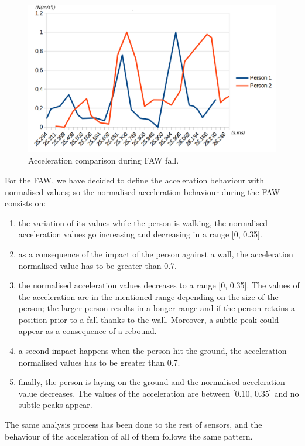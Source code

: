 \documentclass[conference]{IEEEtran}
\theoremstyle{definition}
\begin{document}
\begin{figure}[!h]
  \centering
  \includegraphics[scale=0.2]{img/TwoFallsComparative.png}
  \caption[Acceleration during FAW fall]{Acceleration comparison during FAW fall.}
  \label{fig:FAWcomparison}
\end{figure}

For the FAW, we have decided to define the acceleration behaviour with normalised values; so the 
normalised acceleration behaviour during the FAW consists on:
\begin{enumerate}
 \item the variation of its values while the person is walking, the normalised acceleration values go increasing and
 decreasing in a range [0, 0.35].
 \item as a consequence of the impact of the person against a wall, the acceleration normalised value 
 has to be greater than 0.7.
 \item the normalised acceleration values decreases to a range [0, 0.35]. The values of the acceleration are 
 in the mentioned range depending on the size of the person; the larger person results in a longer range 
 and if the person retains a position prior to a fall thanks to the wall. Moreover, a subtle peak could 
 appear as a consequence of a rebound.
 \item a second impact happens when the person hit the ground, the acceleration normalised values has to 
 be greater than 0.7.
 \item finally, the person is laying on the ground and the normalised acceleration value decreases. The 
 values of the acceleration are between [0.10, 0.35] and no subtle peaks appear. 
\end{enumerate}

The same analysis process has been done to the rest of sensors, and the behaviour of the acceleration of all of them follows the same pattern.
\end{document}
